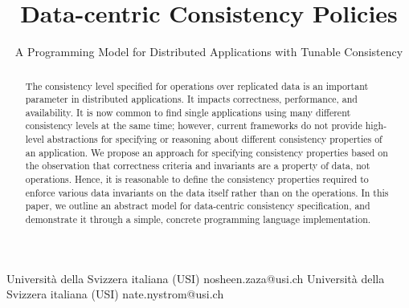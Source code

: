 \documentclass[preprint,numbers]{sigplanconf}
\begin{document}
\setlength{\pdfpageheight}{\paperheight}
\setlength{\pdfpagewidth}{\paperwidth}




\title{Data-centric Consistency Policies}
\subtitle{A Programming Model for Distributed Applications with Tunable Consistency}

           {Universit\`a della Svizzera italiana (USI)}
           {nosheen.zaza@usi.ch}
           {Universit\`a della Svizzera italiana (USI)}
           {nate.nystrom@usi.ch}

\maketitle

\begin{abstract}
The consistency level specified for operations over replicated data is 
an important parameter in distributed applications. It impacts correctness, 
performance, and availability. It is now common to find single applications
using many different consistency
levels at the same time; however, current frameworks do not
provide high-level abstractions for specifying or reasoning about different consistency properties of an application. 
We propose an approach for specifying consistency properties based on the
observation that
correctness criteria and invariants are a property of data, not operations.
Hence, it is reasonable to define the consistency properties
  required to enforce various data invariants on the data itself rather
  than on the operations. In this paper, we outline an abstract model
for data-centric consistency specification, and demonstrate it through a simple,
concrete programming language implementation.
\end{abstract}


\end{document}
